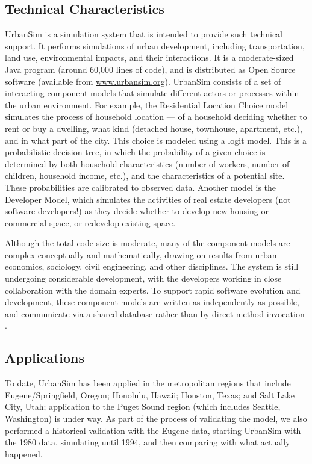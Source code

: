 \documentclass[times, 10pt,twocolumn]{article}
\begin{document}
\subsection{Technical Characteristics}

UrbanSim \cite{waddell-japa-2002,waddell-nse-2003} is a simulation system
that is intended to provide such technical support.  It performs
simulations of urban development, including transportation, land use,
environmental impacts, and their interactions.  It is a moderate-sized Java
program (around 60,000 lines of code), and is distributed as Open Source
software (available from \url{www.urbansim.org}).  UrbanSim consists of a
set of interacting component models that simulate different actors or
processes within the urban environment.  For example, the Residential
Location Choice model simulates the process of household location --- of a
household deciding whether to rent or buy a dwelling, what kind (detached
house, townhouse, apartment, etc.), and in what part of the city.  This
choice is modeled using a logit model.  This is a probabilistic decision
tree, in which the probability of a given choice is determined by both
household characteristics (number of workers, number of children, household
income, etc.), and the characteristics of a potential site.  These
probabilities are calibrated to observed data.  Another model is the
Developer Model, which simulates the activities of real estate developers
(not software developers!) as they decide whether to develop new housing or
commercial space, or redevelop existing space.

Although the total code size is moderate, many of the component models are
complex conceptually and mathematically, drawing on results from urban
economics, sociology, civil engineering, and other disciplines.  The system
is still undergoing considerable development, with the developers working
in close collaboration with the domain experts.  To support rapid software
evolution and development, these component models are written as
independently as possible, and communicate via a shared database rather
than by direct method invocation \cite{noth-ceus-2003}.

\subsection{Applications}
\label{applications}

To date, UrbanSim has been applied in the metropolitan regions that include
Eugene/Springfield, Oregon; Honolulu, Hawaii; Houston, Texas; and Salt Lake
City, Utah; application to the Puget Sound region (which includes Seattle,
Washington) is under way.  As part of the process of validating the model,
we also performed a historical validation with the Eugene data, starting
UrbanSim with the 1980 data, simulating until 1994, and then comparing with
what actually happened.
\end{document}
